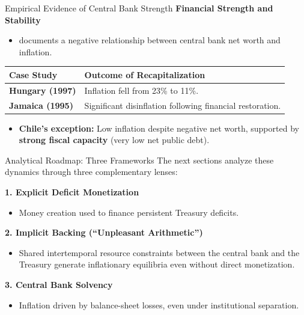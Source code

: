\documentclass[11pt,aspectratio=169]{beamer}
\begin{document}
\begin{frame}{Empirical Evidence of Central Bank Strength}
\small
\textbf{Financial Strength and Stability}
\begin{itemize}
    \item \textcite{stella2008} documents a negative relationship between central bank net worth and inflation.
\end{itemize}

\vspace{0.2cm}

\begin{table}
\footnotesize
\centering
\begin{tabular}{@{}ll@{}}
\toprule
\textbf{Case Study} & \textbf{Outcome of Recapitalization} \\ \midrule
\textbf{Hungary (1997)}   & Inflation fell from 23\% to 11\%. \\
\textbf{Jamaica (1995)}   & Significant disinflation following financial restoration. \\ \bottomrule
\end{tabular}
\end{table}

\begin{itemize}
    \item \textbf{Chile’s exception:} Low inflation despite negative net worth, supported by \textbf{strong fiscal capacity} (very low net public debt).

\end{itemize}
\end{frame}


\begin{frame}{Analytical Roadmap: Three Frameworks}
\small
The next sections analyze these dynamics through three complementary lenses:

\vspace{0.35cm}
\textbf{1. Explicit Deficit Monetization}
\begin{itemize}
    \item Money creation used to finance persistent Treasury deficits.
\end{itemize}

\vspace{0.2cm}
\textbf{2. Implicit Backing (\enquote{Unpleasant Arithmetic})}
\begin{itemize}
    \item Shared intertemporal resource constraints between the central bank and the Treasury generate inflationary equilibria even without direct monetization.
\end{itemize}

\vspace{0.2cm}
\textbf{3. Central Bank Solvency}
\begin{itemize}
    \item Inflation driven by balance-sheet losses, even under institutional separation.
\end{itemize}
\end{frame}
\end{document}
